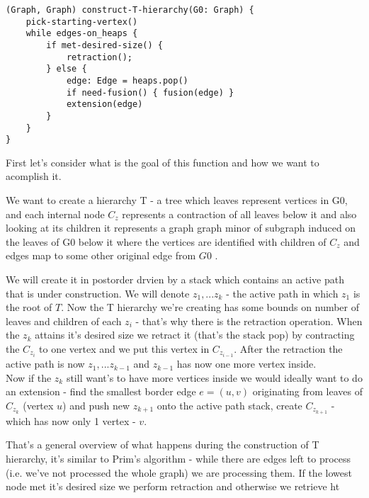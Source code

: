 \documentclass{article}
\begin{document}
\begin{lstlisting}
(Graph, Graph) construct-T-hierarchy(G0: Graph) {
    pick-starting-vertex()
    while edges-on_heaps {
        if met-desired-size() {
            retraction();
        } else {
            edge: Edge = heaps.pop()
            if need-fusion() { fusion(edge) }
            extension(edge)
        }
    }
}
\end{lstlisting}
First let's consider what is the goal of this function and how we want to acomplish it.

We want to create a hierarchy T - a tree which leaves represent vertices in G0, and each internal node $C_z$ represents a contraction of all leaves below it and also looking at its children it represents a graph graph minor of subgraph induced on the leaves of G0 below it where the vertices are identified with children of $C_z$ and edges map to some other original edge from $G0$ .

We will create it in postorder drvien by a stack which contains an active path that is under construction. We will denote $z_1,...z_k$ - the active path in which $z_1$ is the root of $T$. Now the T hierarchy we're creating has some bounds on number of leaves and children of each $z_i$ - that's why there is the retraction operation. When the $z_k$ attains it's desired size we retract it (that's the stack pop) by contracting the $C_{z_i}$ to one vertex and we put this vertex in $C_{z_{i-1}}$. After the retraction the active path is now $z_1, ... z_{k-1}$ and $z_{k-1}$ has now one more vertex inside. \\
Now if the $z_k$ still want's to have more vertices inside we would ideally want to do an extension - find the smallest border edge $e = (u, v)$ originating from leaves of $C_{z_k}$ (vertex $u$)  and push new $z_{k+1}$ onto the active path stack, create  $C_{z_{k
+1}}$ - which has now only 1 vertex - $v$. 

That's a general overview of what happens during the construction of T hierarchy, it's similar to Prim's algorithm - while there are edges left to process (i.e. we've not processed the whole graph) we are processing  them. If the lowest node met it's desired size we perform retraction and otherwise we retrieve ht
\end{document}
